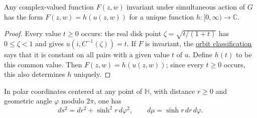 \begin{corollary}\label{hyperbolic.radial-functions}
Any complex-valued function $F(z,w)$ invariant under simultaneous action of $G$ has the form $F(z,w)=h(u(z,w))$ for a unique function $h:[0,\infty)\to\mathbb C$.
\end{corollary}

\begin{proof}
Every value $t\geq0$ occurs: the real disk point $\zeta=\sqrt{t/(1+t)}$ has $0\leq\zeta<1$ and gives $u(i,C^{-1}(\zeta))=t$. If $F$ is invariant, the \hyperref[hyperbolic.pair-orbits]{orbit classification} says that it is constant on all pairs with a given value $t$ of $u$. Define $h(t)$ to be this common value. Then $F(z,w)=h(u(z,w))$; since every $t\geq0$ occurs, this also determines $h$ uniquely.
\end{proof}

\begin{proposition}\label{hyperbolic.polar-coordinates}
In polar coordinates centered at any point of $\mathbb H$, with distance $r\geq0$ and geometric angle $\varphi$ modulo $2\pi$, one has
\[
 ds^2=dr^2+\sinh^2 r\,d\varphi^2,\qquad
 d\mu=\sinh r\,dr\,d\varphi.
\]
\end{proposition}

